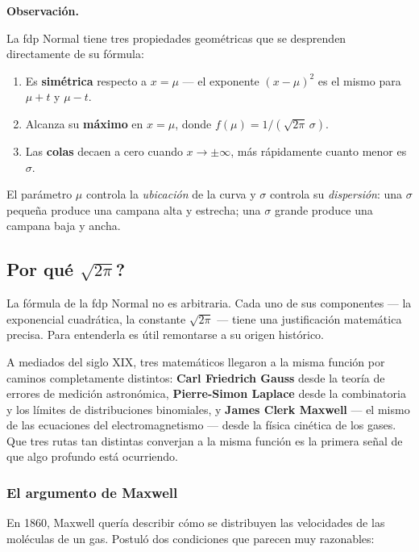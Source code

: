 \documentclass[12pt, a4paper]{book}
\newenvironment{observacion}{%
    \par\medskip\noindent\textbf{\color{azul}Observaci\'{o}n.}\enspace\itshape
}{\par\medskip}
\numberwithin{equation}{chapter}
\begin{document}
\begin{observacion}
	La fdp Normal tiene tres propiedades geométricas que se
	desprenden directamente de su fórmula:
	\begin{enumerate}[label=\textbf{\roman*)}]
		\item Es \textbf{simétrica} respecto a $x = \mu$ --- el
		exponente $(x-\mu)^2$ es el mismo para $\mu + t$ y
		$\mu - t$.
		\item Alcanza su \textbf{máximo} en $x = \mu$, donde
		$f(\mu) = 1/(\sqrt{2\pi}\,\sigma)$.
		\item Las \textbf{colas} decaen a cero cuando
		$x \to \pm\infty$, más rápidamente cuanto menor es
		$\sigma$.
	\end{enumerate}
	El parámetro $\mu$ controla la \emph{ubicación} de la curva
	y $\sigma$ controla su \emph{dispersión}: una $\sigma$ pequeña
	produce una campana alta y estrecha; una $\sigma$ grande
	produce una campana baja y ancha.
\end{observacion}

\subsection{\textquestiondown Por qu\'{e} $\sqrt{2\pi}$?}

La fórmula de la fdp Normal no es arbitraria. Cada uno de sus
componentes --- la exponencial cuadrática, la constante
$\sqrt{2\pi}$ --- tiene una justificación matemática precisa.
Para entenderla es útil remontarse a su origen histórico.

A mediados del siglo XIX, tres matemáticos llegaron a la misma
función por caminos completamente distintos: \textbf{Carl
	Friedrich Gauss} desde la teoría de errores de medición
astronómica, \textbf{Pierre-Simon Laplace} desde la combinatoria
y los límites de distribuciones binomiales, y \textbf{James
	Clerk Maxwell} --- el mismo de las ecuaciones del
electromagnetismo --- desde la física cinética de los gases.
Que tres rutas tan distintas converjan a la misma función es la
primera señal de que algo profundo está ocurriendo.

\subsubsection{El argumento de Maxwell}

En 1860, Maxwell quería describir cómo se distribuyen las
velocidades de las moléculas de un gas. Postuló dos condiciones
que parecen muy razonables:
\end{document}
